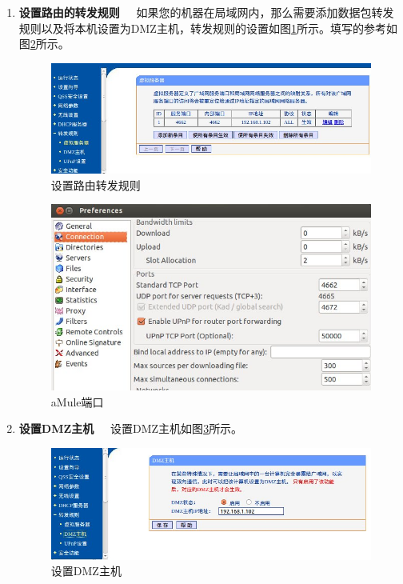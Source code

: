 \documentclass[paper=a4,fontsize=11pt]{article}
\begin{document}
	\begin{enumerate}
		\setcounter{enumi}{0}
		\item\textbf{{设置路由的转发规则~~}}
		如果您的机器在局域网内，那么需要添加数据包转发规则以及将本机设置为DMZ主机，转发规则的设置如图\ref{RouterTransportRule}所示。填写的参考如图\ref{aMulePortParameter}所示。	
		\begin{figure}[htbp]
			\centering
			\includegraphics[scale=0.5]{RouterTransportRule.jpeg}
			\caption{设置路由转发规则}
			\label{RouterTransportRule}
		\end{figure}
		
		\begin{figure}[htbp]
			\centering
			\includegraphics[scale=0.5]{aMulePortParameter.jpeg}
			\caption{aMule端口}
			\label{aMulePortParameter}
		\end{figure}
		
		\item{\textbf{设置DMZ主机~~}}
		设置DMZ主机如图\ref{SetDMZServer}所示。
		\begin{figure}[htbp]
			\centering
			\includegraphics[scale=0.5]{SetDMZServer.jpeg}
			\caption{设置DMZ主机}
			\label{SetDMZServer}
		\end{figure}
		
	\end{enumerate}
	
\end{document}
